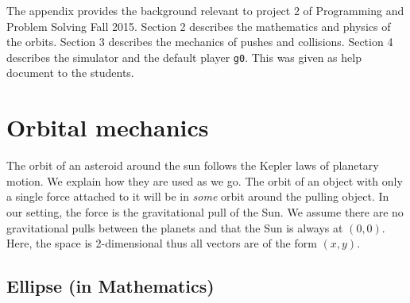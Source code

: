 \begin{appendices}
\appendix
\label{appendix}
The appendix provides the background relevant to project 2 of Programming and 
Problem Solving Fall 2015. Section 2 describes the mathematics and physics of the 
orbits. Section 3 describes the mechanics of pushes and collisions. Section 4 
describes the simulator and the default player \verb#g0#. This was given as 
help document to the students.
\section{Orbital mechanics}

The orbit of an asteroid around the sun follows the Kepler laws of planetary motion. We explain how they are used as we go. The orbit of an object with only a single force attached to it will be in \emph{some} orbit around the pulling object. In our setting, the force is the gravitational pull of the Sun. We assume there are no gravitational pulls between the planets and that the Sun is always at $(0,0)$. Here, the space is 2-dimensional thus all vectors are of the form $(x,y)$.


\subsection{Ellipse (in Mathematics)}


\end{appendices}
